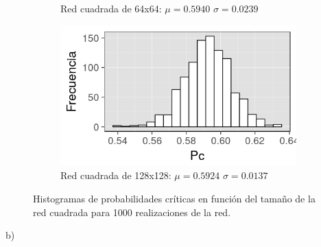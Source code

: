 \documentclass[%
 reprint,
 amsmath,amssymb,
 aps,
spanish]{revtex4-1}
\begin{document}
\begin{figure}[h]
\begin{subfigure}{.25\textwidth}
  \caption{Red cuadrada de 64x64: $\mu=0.5940$ $\sigma=0.0239$}
  \label{fig:1a64x64}
\end{subfigure}%
\begin{subfigure}{.25\textwidth}
  \centering
  \includegraphics[width=.9\linewidth]{ej1a/hist128x128}
  \caption{Red cuadrada de 128x128: $\mu=0.5924$ $\sigma=0.0137$}
  \label{fig:1a128x128}
\end{subfigure}
\caption{Histogramas de probabilidades críticas en función del tamaño de la red cuadrada para 1000 realizaciones de la red.}
\label{fig:histograma_red_cuadrada_1a}
\end{figure}

b)
\end{document}
